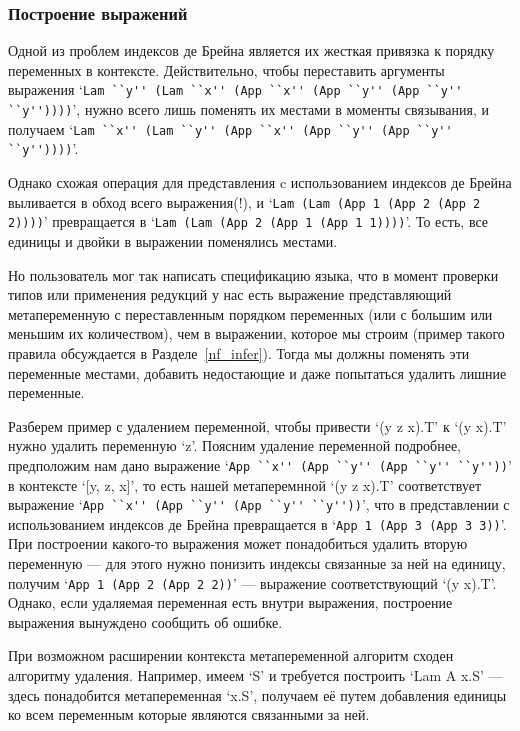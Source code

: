 \subsubsection{Построение выражений}\label{build_exp}
Одной из проблем индексов де Брейна является их жесткая привязка к порядку переменных в контексте. Действительно, чтобы переставить аргументы выражения `\lstinline{Lam ``y'' (Lam ``x'' (App ``x'' (App ``y'' (App ``y'' ``y''))))}', нужно всего лишь поменять их местами в моменты связывания, и получаем `\lstinline{Lam ``x'' (Lam ``y'' (App ``x'' (App ``y'' (App ``y'' ``y''))))}'.

Однако схожая операция для представления c использованием индексов де Брейна выливается в обход всего выражения(!), и `\lstinline{Lam (Lam (App 1 (App 2 (App 2 2))))}' превращается в `\lstinline{Lam (Lam (App 2 (App 1 (App 1 1))))}'. То есть, все единицы и двойки в выражении поменялись местами.

Но пользователь мог так написать спецификацию языка, что в момент проверки типов или применения редукций у нас есть выражение представляющий метапеременную с переставленным порядком переменных (или с большим или меньшим их количеством), чем в выражении, которое мы строим (пример такого правила обсуждается в Разделе~\ref{nf_infer}). Тогда мы должны поменять эти переменные местами, добавить недостающие и даже попытаться удалить лишние переменные.

Разберем пример с удалением переменной, чтобы привести `(y z x).T' к `(y x).T' нужно удалить переменную `z'. Поясним удаление переменной подробнее, предположим нам дано выражение `\lstinline{App ``x'' (App ``y'' (App ``y'' ``y''))}' в контексте `[y, z, x]', то есть нашей метаперемнной `(y z x).T' соответствует выражение `\lstinline{App ``x'' (App ``y'' (App ``y'' ``y''))}', что в представлении с использованием индексов де Брейна превращается в `\lstinline{App 1 (App 3 (App 3 3))}'. При построении какого-то выражения может понадобиться удалить вторую переменную --- для этого нужно понизить индексы связанные за ней на единицу, получим `\lstinline{App 1 (App 2 (App 2 2))}' --- выражение соответствующий `(y x).T'. Однако, если удаляемая переменная есть внутри выражения, построение выражения вынуждено сообщить об ошибке.

При возможном расширении контекста метапеременной алгоритм сходен алгоритму удаления. Например, имеем `S' и требуется построить `Lam A x.S' --- здесь понадобится метапеременная `x.S', получаем её путем добавления единицы ко всем переменным которые являются связанными за ней.

